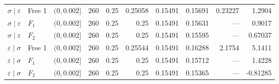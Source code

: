 \begin{longtable}{lllrrrrrrr}
\midrule
$\sigma\mid \varepsilon$ & Free 1 & $(0,0.002]$ & 260 & 0.25 & 0.25058 & 0.15491 & 0.15691 & 0.23227 & 1.2904\\*
$\sigma\mid \varepsilon$ & $F_1$ & $(0,0.002]$ & 260 & 0.25 & 0.25 & 0.15491 & 0.15631 & --- & 0.9017\\*
$\sigma\mid \varepsilon$ & $F_2$ & $(0,0.002]$ & 260 & 0.25 & 0.25 & 0.15491 & 0.15595 & --- & 0.67037\\
\midrule
$\varepsilon\mid \sigma$ & Free 1 & $(0,0.002]$ & 260 & 0.25 & 0.25544 & 0.15491 & 0.16288 & 2.1754 & 5.1411\\*
$\varepsilon\mid \sigma$ & $F_1$ & $(0,0.002]$ & 260 & 0.25 & 0.25 & 0.15491 & 0.15712 & --- & 1.4228\\*
$\varepsilon\mid \sigma$ & $F_2$ & $(0,0.002]$ & 260 & 0.25 & 0.25 & 0.15491 & 0.15365 & --- & -0.81285\\
\end{longtable}
\endgroup
